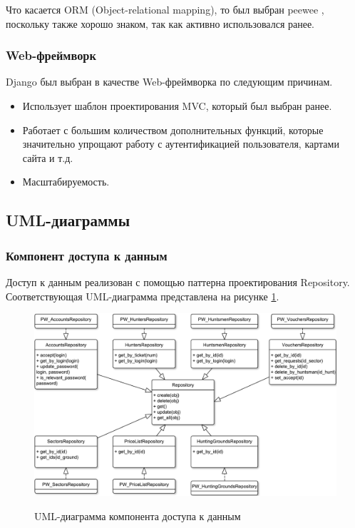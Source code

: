 	Что касается ORM (Object-relational mapping), то был выбран peewee \cite{peewee}, поскольку также хорошо знаком, так как активно использовался ранее.
	
	\subsubsection{Web-фреймворк}
	Django \cite{django} был выбран в качестве Web-фреймворка по следующим причинам.
	\begin{itemize}
		\item Использует шаблон проектирования MVC, который был выбран ранее.
		\item Работает с большим количеством дополнительных функций, которые значительно упрощают работу с аутентификацией пользователя, картами сайта и т.д.
		\item Масштабируемость.
	\end{itemize}

	\subsection{UML-диаграммы}
		\subsubsection{Компонент доступа к данным}
		Доступ к данным реализован с помощью паттерна проектирования Repository. Соответствующая UML-диаграмма представлена на рисунке \ref{fig6:image}.
		
		\begin{figure}[ph!]
			\centering
			\begin{center}
				{\includegraphics[scale=0.6]{schemes/uml_access_rep.pdf}}
				\caption{UML-диаграмма компонента доступа к данным}
				\label{fig6:image}
			\end{center}
		\end{figure}
		\newpage
	
